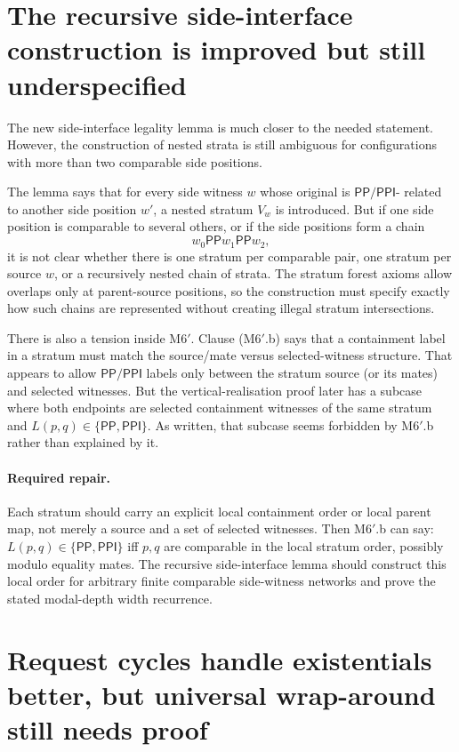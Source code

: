 \documentclass[11pt]{article}
\newcommand{\PP}{\mathsf{PP}}
\newcommand{\PPI}{\mathsf{PPI}}
\begin{document}
\section{The recursive side-interface construction is improved but still underspecified}

The new side-interface legality lemma is much closer to the needed statement.
However, the construction of nested strata is still ambiguous for configurations
with more than two comparable side positions.

The lemma says that for every side witness $w$ whose original is $\PP/\PPI$-
related to another side position $w'$, a nested stratum $V_w$ is introduced.
But if one side position is comparable to several others, or if the side
positions form a chain
\[
  w_0\PP w_1\PP w_2,
\]
it is not clear whether there is one stratum per comparable pair, one stratum
per source $w$, or a recursively nested chain of strata.  The stratum forest
axioms allow overlaps only at parent-source positions, so the construction must
specify exactly how such chains are represented without creating illegal
stratum intersections.

There is also a tension inside M6$'$.  Clause (M6$'$.b) says that a containment
label in a stratum must match the source/mate versus selected-witness structure.
That appears to allow $\PP/\PPI$ labels only between the stratum source (or its
mates) and selected witnesses.  But the vertical-realisation proof later has a
subcase where both endpoints are selected containment witnesses of the same
stratum and $L(p,q)\in\{\PP,\PPI\}$.  As written, that subcase seems forbidden
by M6$'$.b rather than explained by it.

\paragraph{Required repair.}
Each stratum should carry an explicit local containment order or local parent
map, not merely a source and a set of selected witnesses.  Then M6$'$.b can say:
$L(p,q)\in\{\PP,\PPI\}$ iff $p,q$ are comparable in the local stratum order,
possibly modulo equality mates.  The recursive side-interface lemma should
construct this local order for arbitrary finite comparable side-witness
networks and prove the stated modal-depth width recurrence.

\section{Request cycles handle existentials better, but universal wrap-around still needs proof}
\end{document}
